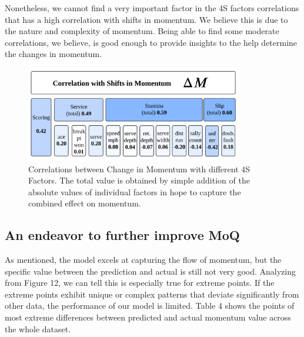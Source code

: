 \documentclass[12pt]{article}  %
\begin{document}
Nonetheless, we cannot find a very important factor in the 4S factors correlations that has a high correlation with shifts in momentum. We believe this is due to the nature and complexity of momentum. Being able to find some moderate correlations, we believe, is good enough to provide insights to the help determine the changes in momentum.

\begin{figure}[htbp]  %
	\centering  %
	\includegraphics[width=0.85\textwidth]{correlation.png} %
	\caption{Correlations between Change in Momentum with different 4S Factors. The total value is obtained by simple addition of the absolute values of individual factors in hope to capture the combined effect on momentum.} %
\end{figure}
\vspace{-0.2cm}


\subsection{An endeavor to further improve MoQ}
As mentioned, the model excels at capturing the flow of momentum, but the specific value between the prediction and actual is still not very good. Analyzing from Figure 12, we can tell this is especially true for extreme points. If the extreme points exhibit unique or complex patterns that deviate significantly from other data, the performance of our model is limited. Table 4 shows the points of most extreme differences between predicted and actual momentum value across the whole dataset.

\begin{table}[htbp]
	\centering
	\caption{Deviation of Predicted Momentum at Extreme Values}
\end{table}
\end{document}
